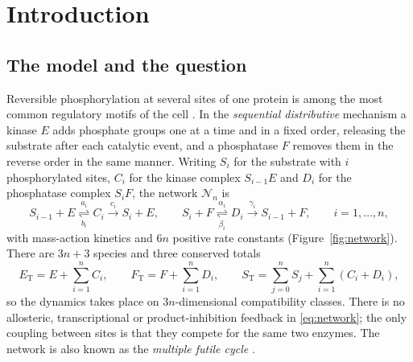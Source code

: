 \documentclass[11pt,a4paper]{article}
\theoremstyle{plain}
\theoremstyle{definition}
\theoremstyle{remark}
\newcommand{\cN}{\mathcal N}
\newcommand{\ET}{E_{\mathrm T}}
\newcommand{\FT}{F_{\mathrm T}}
\newcommand{\ST}{S_{\mathrm T}}
\begin{document}
\tableofcontents

\section{Introduction}\label{sec:intro}

\subsection{The model and the question}
Reversible phosphorylation at several sites of one protein is among the most common regulatory motifs of the cell \cite{Cohen00}. In the \emph{sequential distributive} mechanism a kinase $E$ adds phosphate groups one at a time and in a fixed order, releasing the substrate after each catalytic event, and a phosphatase $F$ removes them in the reverse order in the same manner. Writing $S_i$ for the substrate with $i$ phosphorylated sites, $C_i$ for the kinase complex $S_{i-1}E$ and $D_i$ for the phosphatase complex $S_iF$, the network $\cN_n$ is
\begin{equation}\label{eq:network}
 S_{i-1}+E \underset{b_i}{\overset{a_i}{\rightleftharpoons}} C_i
 \overset{c_i}{\longrightarrow}S_i+E,\qquad
 S_i+F \underset{\beta_i}{\overset{\alpha_i}{\rightleftharpoons}}D_i
 \overset{\gamma_i}{\longrightarrow}S_{i-1}+F,
 \qquad i=1,\dots,n,
\end{equation}
with mass-action kinetics and $6n$ positive rate constants (Figure~\ref{fig:network}). There are $3n+3$ species and three conserved totals
\begin{equation}\label{eq:totals}
 \ET=E+\sum_{i=1}^n C_i,\qquad \FT=F+\sum_{i=1}^n D_i,\qquad
 \ST=\sum_{j=0}^nS_j+\sum_{i=1}^n(C_i+D_i),
\end{equation}
so the dynamics takes place on $3n$-dimensional compatibility classes. There is no allosteric, transcriptional or product-inhibition feedback in \eqref{eq:network}; the only coupling between sites is that they compete for the same two enzymes. The network is also known as the \emph{multiple futile cycle} \cite{WangSontag08a}.
\end{document}

